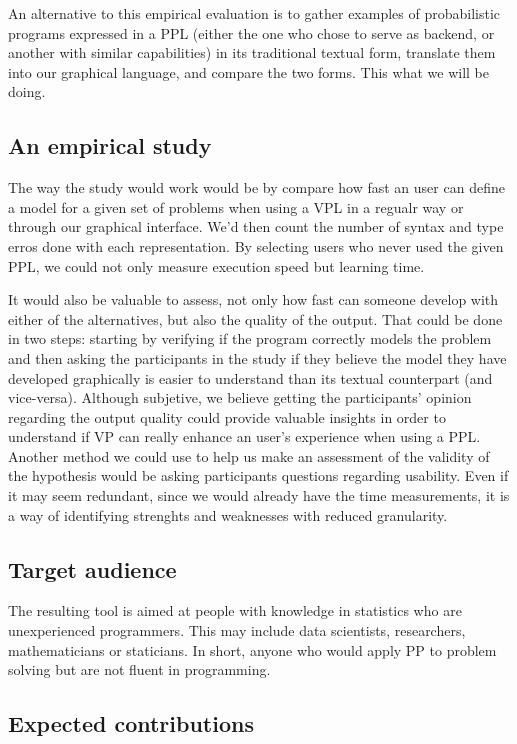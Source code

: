An alternative to this empirical evaluation is to gather examples of probabilistic programs expressed in a
PPL (either the one who chose to serve as backend, or another with similar
capabilities) in its traditional textual form, translate them into our graphical
language, and compare the two forms. This what we will be doing.

\subsection{An empirical study}

The way the study would work would be by compare how fast an user can define a model for a given set of problems
when using a VPL in a regualr way or through our graphical interface. We'd then
count the number of syntax and type erros done with each representation. By
selecting users who never used the given PPL, we could not only measure execution
speed but learning time.

It would also be valuable to assess, not only how fast can someone develop with either
of the alternatives, but also the quality of the output. That could be done in two
steps: starting by verifying if the program correctly models the problem and then
asking the participants in the study if they believe the model they
have developed graphically is easier to understand than its textual counterpart (and
vice-versa).
Although subjetive, we believe getting the participants' opinion
regarding the output quality could provide valuable insights in order to understand if VP can
really enhance an user's experience when using a PPL. Another method we could use
to help us make an assessment of the validity of the hypothesis would be asking
participants questions regarding usability. Even if it may seem redundant, since
we would already have the time measurements, it is a way of identifying strenghts and
weaknesses with reduced granularity.

\subsection{Target audience}

The resulting tool is aimed at people with knowledge in statistics
who are unexperienced programmers. This may include data scientists, researchers,
mathematicians or staticians. In short, anyone who would apply PP to problem
solving but are not fluent in programming.

\subsection{Expected contributions}


